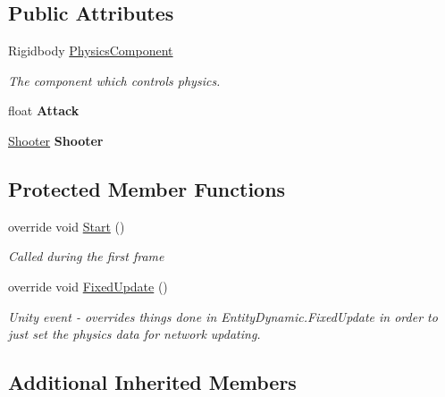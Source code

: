 \subsection*{Public Attributes}
\begin{DoxyCompactItemize}
\item 
Rigidbody \hyperlink{class_skyrates_1_1_entity_1_1_entity_projectile_a8882ddff06e010914232b464f916704a}{Physics\-Component}
\begin{DoxyCompactList}\small\item\em The component which controls physics. \end{DoxyCompactList}\item 
\hypertarget{class_skyrates_1_1_entity_1_1_entity_projectile_a1638947a56e89b987643b0a511ecf561}{float {\bfseries Attack}}\label{class_skyrates_1_1_entity_1_1_entity_projectile_a1638947a56e89b987643b0a511ecf561}

\item 
\hypertarget{class_skyrates_1_1_entity_1_1_entity_projectile_ae843aa3c9e8278052f514c76dbf77875}{\hyperlink{class_skyrates_1_1_mono_1_1_shooter}{Shooter} {\bfseries Shooter}}\label{class_skyrates_1_1_entity_1_1_entity_projectile_ae843aa3c9e8278052f514c76dbf77875}

\end{DoxyCompactItemize}
\subsection*{Protected Member Functions}
\begin{DoxyCompactItemize}
\item 
override void \hyperlink{class_skyrates_1_1_entity_1_1_entity_projectile_a0d55be517e4dd2a7a22fbef3681f2ec2}{Start} ()
\begin{DoxyCompactList}\small\item\em Called during the first frame \end{DoxyCompactList}\item 
override void \hyperlink{class_skyrates_1_1_entity_1_1_entity_projectile_a545a608eb8cf7e5c7ab0ce7659b8bc27}{Fixed\-Update} ()
\begin{DoxyCompactList}\small\item\em Unity event -\/ overrides things done in Entity\-Dynamic.\-Fixed\-Update in order to just set the physics data for network updating. \end{DoxyCompactList}\end{DoxyCompactItemize}
\subsection*{Additional Inherited Members}


